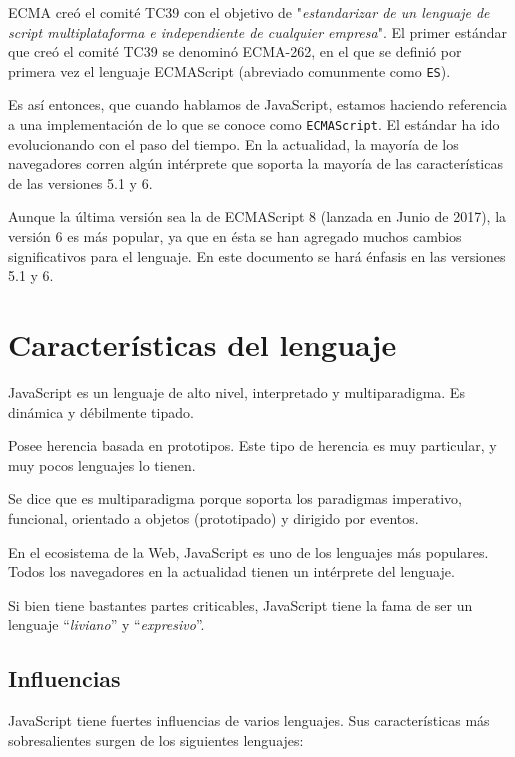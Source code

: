 ECMA creó el comité TC39 con el objetivo de "\emph{estandarizar de un lenguaje de script multiplataforma e independiente de cualquier empresa}". El primer estándar que creó el comité TC39 se denominó ECMA-262, en el que se definió por primera vez el lenguaje ECMAScript (abreviado comunmente como \texttt{ES}).

Es así entonces, que cuando hablamos de JavaScript, estamos haciendo referencia a una implementación de lo que se conoce como \texttt{ECMAScript}. El estándar ha ido evolucionando con el paso del tiempo. En la actualidad, la mayoría de los navegadores corren algún intérprete que soporta la mayoría de las características de las versiones 5.1 y 6. 

Aunque la última versión sea la de ECMAScript 8 (lanzada en Junio de 2017), la versión 6 es más popular, ya que en ésta se han agregado muchos cambios significativos para el lenguaje. En este documento se hará énfasis en las versiones 5.1 y 6.


\section{Características del lenguaje}

JavaScript es un lenguaje de alto nivel, interpretado y multiparadigma. Es dinámica y débilmente tipado. 

Posee herencia basada en prototipos. Este tipo de herencia es muy particular, y muy pocos lenguajes lo tienen. 

Se dice que es multiparadigma porque soporta los paradigmas imperativo, funcional, orientado a objetos (prototipado) y dirigido por eventos.

En el ecosistema de la Web, JavaScript es uno de los lenguajes más populares. Todos los navegadores en la actualidad tienen un intérprete del lenguaje.

Si bien tiene bastantes partes criticables, JavaScript tiene la fama de ser un lenguaje "`\textit{liviano}"' y "`\textit{expresivo}"'.

\subsection{Influencias}

JavaScript tiene fuertes influencias de varios lenguajes. Sus características más sobresalientes surgen de los siguientes lenguajes: 

